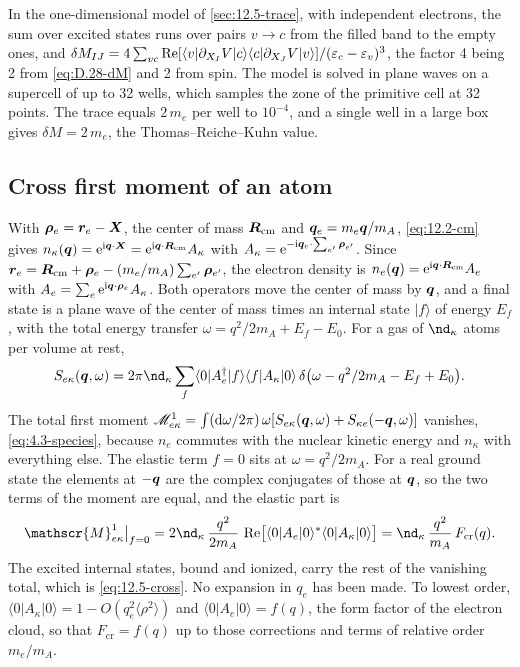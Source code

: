 In the one-dimensional model of \cref{sec:12.5-trace}, with independent electrons, the sum over excited states runs over pairs $v \to c$ from the filled band to the empty ones, and $\delta M_{IJ} = 4\sum_{vc}\operatorname{Re}[\langle v|\partial_{X_I}V|c\rangle\langle c|\partial_{X_J}V|v\rangle]/(\varepsilon_c - \varepsilon_v)^3$, the factor 4 being 2 from \cref{eq:D.28-dM} and 2 from spin. The model is solved in plane waves on a supercell of up to 32 wells, which samples the zone of the primitive cell at 32 points. The trace equals $2\,m_e$ per well to $10^{-4}$, and a single well in a large box gives $\delta M = 2\,m_e$, the Thomas--Reiche--Kuhn value.

\subsection{Cross first moment of an atom}\label{app:D.34-cross}

With $\bm{\rho}_e = \bm{r}_e - \bm{X}$, the center of mass $\bm{R}_{\mathrm{cm}}$ and $\bm{q}_e = m_e\bm{q}/m_A$, \cref{eq:12.2-cm} gives $n_\kappa(\bm{q}) = \mathrm{e}^{\mathrm{i}\bm{q}\cdot\bm{X}} = \mathrm{e}^{\mathrm{i}\bm{q}\cdot\bm{R}_{\mathrm{cm}}}A_\kappa$ with $A_\kappa = \mathrm{e}^{-\mathrm{i}\bm{q}_e\cdot\sum_{e'}\bm{\rho}_{e'}}$. Since $\bm{r}_e = \bm{R}_{\mathrm{cm}} + \bm{\rho}_e - (m_e/m_A)\sum_{e'}\bm{\rho}_{e'}$, the electron density is $n_e(\bm{q}) = \mathrm{e}^{\mathrm{i}\bm{q}\cdot\bm{R}_{\mathrm{cm}}}A_e$ with $A_e = \sum_e\mathrm{e}^{\mathrm{i}\bm{q}\cdot\bm{\rho}_e}A_\kappa$. Both operators move the center of mass by $\bm{q}$, and a final state is a plane wave of the center of mass times an internal state $|f\rangle$ of energy $E_f$, with the total energy transfer $\omega = q^2/2m_A + E_f - E_0$. For a gas of $\nd_\kappa$ atoms per volume at rest,
\begin{equation*}
  S_{e\kappa}(\vect{q},\omega) = 2\pi\nd_\kappa\sum_f\langle0|A_e^\dagger|f\rangle\langle f|A_\kappa|0\rangle\,\delta\bigl(\omega - q^2/2m_A - E_f + E_0\bigr) .
\end{equation*}
The total first moment $\mathscr{M}^1_{e\kappa} = \int(\mathrm{d}\omega/2\pi)\,\omega[S_{e\kappa}(\bm{q},\omega) + S_{\kappa e}(-\bm{q},\omega)]$ vanishes, \cref{eq:4.3-species}, because $n_e$ commutes with the nuclear kinetic energy and $n_\kappa$ with everything else. The elastic term $f = 0$ sits at $\omega = q^2/2m_A$. For a real ground state the elements at $-\bm{q}$ are the complex conjugates of those at $\bm{q}$, so the two terms of the moment are equal, and the elastic part is
\begin{equation*}
  \mathscr{M}^1_{e\kappa}\big|_{f = 0} = 2\nd_\kappa\,\frac{q^2}{2m_A}\,\Real\bigl[\langle0|A_e|0\rangle^*\langle0|A_\kappa|0\rangle\bigr] = \nd_\kappa\,\frac{q^2}{m_A}\,F_{\mathrm{cr}}(q) .
\end{equation*}
The excited internal states, bound and ionized, carry the rest of the vanishing total, which is \cref{eq:12.5-cross}. No expansion in $q_e$ has been made. To lowest order, $\langle0|A_\kappa|0\rangle = 1 - O(q_e^2\langle\rho^2\rangle)$ and $\langle0|A_e|0\rangle = f(q)$, the form factor of the electron cloud, so that $F_{\mathrm{cr}} = f(q)$ up to those corrections and terms of relative order $m_e/m_A$.

